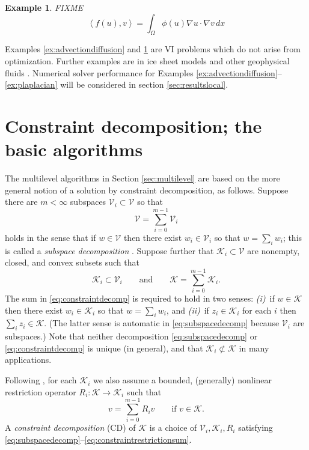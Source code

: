 \documentclass[letterpaper,final,12pt,reqno]{amsart}
\theoremstyle{cstyle}
\theoremstyle{dstyle}
\newtheorem{example}[theorem]{Example}
\numberwithin{equation}{section}
\numberwithin{figure}{section}
\numberwithin{table}{section}
\numberwithin{theorem}{section}
\newcommand{\grad}{\nabla}
\newcommand{\cK}{\mathcal{K}}
\newcommand{\cV}{\mathcal{V}}
\newcommand{\ip}[2]{\left<#1,#2\right>}
\begin{document}
\begin{example}  \label{ex:porousgeneralization}  FIXME
\begin{equation}
\ip{f(u)}{v} = \int_\Omega \phi(u) \grad u \cdot \grad v\,dx \label{eq:porousgeneralization}
\end{equation}
\end{example}

Examples \ref{ex:advectiondiffusion} and \ref{ex:porousgeneralization} are VI problems which do not arise from optimization.  Further examples are in ice sheet models \cite{Calvoetal2002,JouvetBueler2012} and other geophysical fluids \cite{Bueler2021conservation}.  Numerical solver performance for Examples \ref{ex:advectiondiffusion}--\ref{ex:plaplacian} will be considered in section \ref{sec:resultslocal}.  %


\section{Constraint decomposition; the basic algorithms} \label{sec:cd}

The multilevel algorithms in Section \ref{sec:multilevel} are based on the more general notion of a solution by constraint decomposition, as follows.  Suppose there are $m<\infty$ subspaces $\cV_i \subset \cV$ so that
\begin{equation}
\cV = \sum_{i=0}^{m-1} \cV_i \label{eq:subspacedecomp}
\end{equation}
holds in the sense that if $w \in \cV$ then there exist $w_i \in \cV_i$ so that $w = \sum_i w_i$; this is called a \emph{subspace decomposition} \cite{Xu1992}.  Suppose further that $\cK_i \subset \cV$ are nonempty, closed, and convex subsets such that
\begin{equation}
\cK_i \subset \cV_i \qquad \text{and} \qquad \cK = \sum_{i=0}^{m-1} \cK_i. \label{eq:constraintdecomp}
\end{equation}
The sum in \eqref{eq:constraintdecomp} is required to hold in two senses: \emph{(i)}~if $w \in \cK$ then there exist $w_i \in \cK_i$ so that $w = \sum_i w_i$, and \emph{(ii)}~if $z_i \in \cK_i$ for each $i$ then $\sum_i z_i \in \cK$.  (The latter sense is automatic in \eqref{eq:subspacedecomp} because $\cV_i$ are subspaces.)  Note that neither decomposition \eqref{eq:subspacedecomp} or \eqref{eq:constraintdecomp} is unique (in general), and that $\cK_i \not\subset \cK$ in many applications.

Following \cite{Tai2003}, for each $\cK_i$ we also assume a bounded, (generally) nonlinear restriction operator $R_i : \cK \to \cK_i$ such that
\begin{equation}
v = \sum_{i=0}^{m-1} R_i v \qquad \text{if } v \in \cK.  \label{eq:constraintrestrictionsum}
\end{equation}
A \emph{constraint decomposition} (CD) of $\cK$ is a choice of $\cV_i,\cK_i,R_i$ satisfying \eqref{eq:subspacedecomp}--\eqref{eq:constraintrestrictionsum}.
\end{document}
